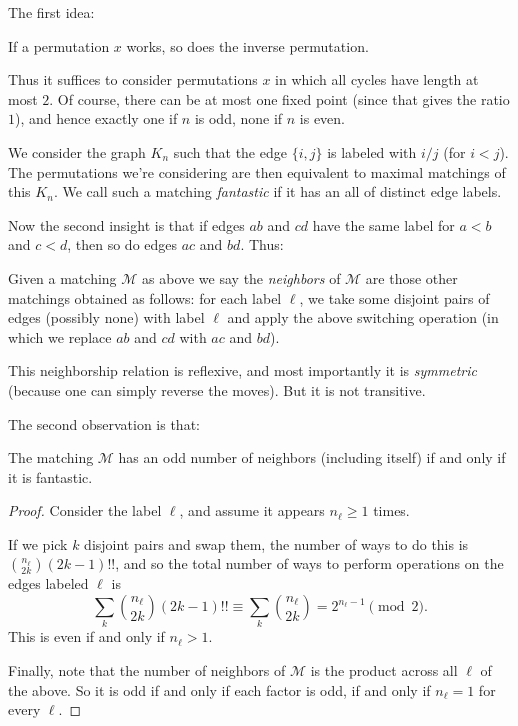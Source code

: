 \documentclass[11pt]{scrartcl}
\begin{document}
The first idea:
\begin{lemma*}
  If a permutation $x$ works, so does the inverse permutation.
\end{lemma*}

Thus it suffices to consider permutations $x$
in which all cycles have length at most $2$.
Of course, there can be at most one fixed point
(since that gives the ratio $1$),
and hence exactly one if $n$ is odd, none if $n$ is even.

We consider the graph $K_n$ such that the edge
$\{i,j\}$ is labeled with $i / j$ (for $i < j$).
The permutations we're considering are then equivalent to maximal
matchings of this $K_n$.
We call such a matching \emph{fantastic} if it has an
all of distinct edge labels.

\bigskip

Now the second insight is that if edges $ab$ and $cd$
have the same label for $a<b$ and $c<d$,
then so do edges $ac$ and $bd$.
Thus:
\begin{definition*}
  Given a matching $\mathcal M$ as above we say the \emph{neighbors}
  of $\mathcal M$ are those other matchings obtained as follows:
  for each label $\ell$,
  we take some disjoint pairs of edges (possibly none)
  with label $\ell$ and apply the above switching operation
  (in which we replace $ab$ and $cd$ with $ac$ and $bd$).
\end{definition*}
This neighborship relation is reflexive,
and most importantly it is \emph{symmetric}
(because one can simply reverse the moves).
But it is not transitive.

The second observation is that:
\begin{claim*}
  The matching $\mathcal M$ has an odd number of neighbors
  (including itself) if and only if it is fantastic.
\end{claim*}
\begin{proof}
  Consider the label $\ell$,
  and assume it appears $n_\ell \ge 1$ times.

  If we pick $k$ disjoint pairs and swap them,
  the number of ways to do this is
  $\binom{n_\ell}{2k} (2k-1)!!$, and so the total
  number of ways to perform operations on the edges
  labeled $\ell$ is
  \[ \sum_k \binom{n_\ell}{2k} (2k-1)!!
    \equiv \sum_k \binom{n_\ell}{2k}
    = 2^{n_\ell-1} \pmod 2.
  \]
  This is even if and only if $n_\ell > 1$.

  Finally, note that the number of neighbors
  of $\mathcal M$ is the product across all $\ell$ of the above.
  So it is odd if and only if each factor is odd,
  if and only if $n_\ell = 1$ for every $\ell$.
\end{proof}
\end{document}
